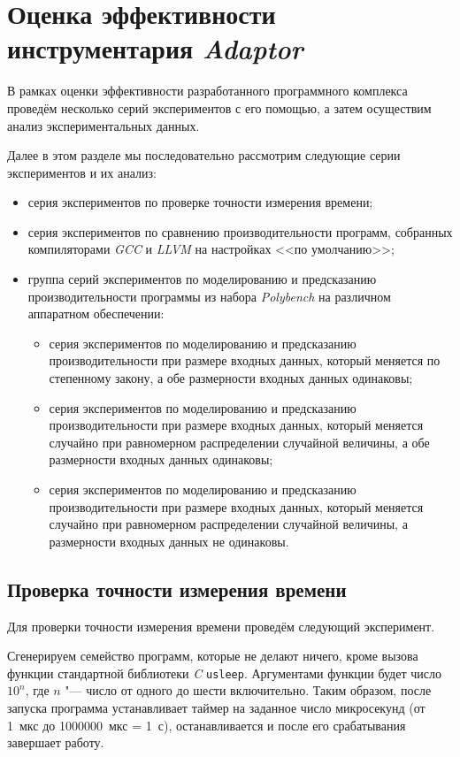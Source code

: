 \section{Оценка эффективности инструментария \textit{Adaptor}}
\label{sec:evaluation}

В рамках оценки эффективности разработанного программного комплекса проведём несколько серий экспериментов с его помощью, а затем осуществим анализ экспериментальных данных.

Далее в этом разделе мы последовательно рассмотрим следующие серии экспериментов и их анализ:
\begin{itemize}
    \item серия экспериментов по проверке точности измерения времени;
    \item серия экспериментов по сравнению производительности программ, собранных компиляторами \textit{GCC} и \textit{LLVM} на настройках <<по умолчанию>>;
    \item группа серий экспериментов по моделированию и предсказанию производительности программы из набора \textit{Polybench} на различном аппаратном обеспечении:
    \begin{itemize}
        \item серия экспериментов по моделированию и предсказанию производительности при размере входных данных, который меняется по степенному закону, а обе размерности входных данных одинаковы;
        \item серия экспериментов по моделированию и предсказанию производительности при размере входных данных, который меняется случайно при равномерном распределении случайной величины, а обе размерности входных данных одинаковы;
        \item серия экспериментов по моделированию и предсказанию производительности при размере входных данных, который меняется случайно при равномерном распределении случайной величины, а размерности входных данных не одинаковы.
    \end{itemize}
\end{itemize}

\subsection{Проверка точности измерения времени}
\label{ssec:series-accuracy}
Для проверки точности измерения времени проведём следующий эксперимент.

Сгенерируем семейство программ, которые не делают ничего, кроме вызова функции стандартной библиотеки \textit{C} \texttt{usleep}. Аргументами функции будет число $10^n$, где $n$ "--- число от одного до шести включительно. Таким образом, после запуска программа устанавливает таймер на заданное число микросекунд (от 1~мкс до 1000000~мкс = 1~с), останавливается и после его срабатывания завершает работу.

